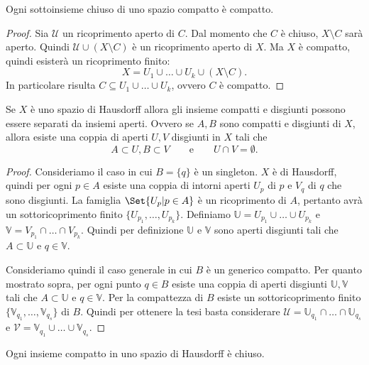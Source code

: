 \begin{pr}\label{pr:spaziCompatti1}
	Ogni sottoinsieme chiuso di uno spazio compatto è compatto.
\end{pr}

\begin{proof}
	Sia \(\mathcal{U}\) un ricoprimento aperto di \(C\).
	Dal momento che \(C\) è chiuso, \(X\setminus C\) sarà aperto.
	Quindi \(\mathcal{U}\cup (X\setminus C)\) è un ricoprimento aperto di \(X\).
	Ma \(X\) è compatto, quindi esisterà un ricoprimento finito:
	\[
		X = U_1 \cup \ldots \cup U_k \cup (X\setminus C).
	\]
	In particolare risulta \(C\subseteq U_1 \cup \ldots \cup U_k\), ovvero \(C\) è compatto.
\end{proof}

\begin{pr}\label{pr:spaziCompatti2}
	Se \(X\) è uno spazio di Hausdorff allora gli insieme compatti e disgiunti possono essere separati da insiemi aperti.
	Ovvero se \(A,B\) sono compatti e disgiunti di \(X\), allora esiste una coppia di aperti \(U,V\) disgiunti in \(X\) tali che
	\[
		A\subset U,B \subset V \qquad\text{e}\qquad U\cap V = \emptyset.
	\]
\end{pr}

\begin{proof}
	Consideriamo il caso in cui \(B=\{q\}\) è un singleton.
	\(X\) è di Hausdorff, quindi per ogni \(p\in A\) esiste una coppia di intorni aperti \(U_p\) di \(p\) e \(V_q\) di \(q\) che sono disgiunti.
	La famiglia \(\Set{U_p | p\in A}\) è un ricoprimento di \(A\), pertanto avrà un sottoricoprimento finito \(\{U_{p_1},\ldots,U_{p_k}\}\).
	Definiamo \(\mathbb{U} = U_{p_1}\cup \ldots \cup U_{p_k}\) e \(\mathbb{V} = V_{p_1} \cap \ldots \cap V_{p_k}\).
	Quindi per definizione \(\mathbb{U}\) e \(\mathbb{V}\) sono aperti disgiunti tali che \(A\subset \mathbb{U}\) e \(q\in \mathbb{V}\).

	Consideriamo quindi il caso generale in cui \(B\) è un generico compatto.
	Per quanto mostrato sopra, per ogni punto \(q\in B\) esiste una coppia di aperti disgiunti \(\mathbb{U},\mathbb{V}\) tali che \(A\subset \mathbb{U}\) e \(q\in \mathbb{V}\).
	Per la compattezza di \(B\) esiste un sottoricoprimento finito \(\{\mathbb{V}_{q_1},\ldots,\mathbb{V}_{q_s}\}\) di \(B\).
	Quindi per ottenere la tesi basta considerare \(\mathcal{U} = \mathbb{U}_{q_1} \cap \ldots \cap \mathbb{U}_{q_s}\) e \(\mathcal{V} = \mathbb{V}_{q_1} \cup \ldots \cup \mathbb{V}_{q_s}\).
\end{proof}

\begin{pr}\label{pr:spaziCompatti3}
	Ogni insieme compatto in uno spazio di Hausdorff è chiuso.
\end{pr}

